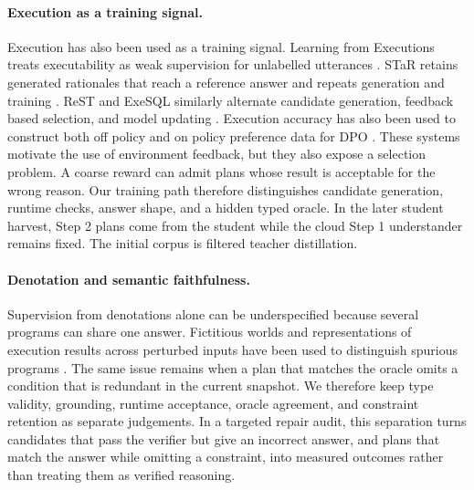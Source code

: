 \paragraph{Execution as a training signal.}
Execution has also been used as a training signal.  Learning from Executions treats executability
as weak supervision for unlabelled utterances \citep{wang2021executions}.  STaR retains generated
rationales that reach a reference answer and repeats generation and training
\citep{zelikman2022star}.  ReST and ExeSQL similarly alternate candidate
generation, feedback based selection, and model updating
\citep{gulcehre2023rest,zhang2025exesql}.  Execution accuracy has also been used to construct both
off policy and on policy preference data for DPO \citep{zhai2025excot}.  These systems motivate the
use of environment feedback,
but they also expose a selection problem.  A coarse reward can admit plans whose result is
acceptable for the wrong reason.  Our training path therefore distinguishes candidate generation,
runtime checks, answer shape, and a hidden typed oracle.  In the later student harvest, Step 2 plans
come from the student while the cloud Step 1 understander remains fixed.  The initial corpus is
filtered teacher distillation.

\paragraph{Denotation and semantic faithfulness.}
Supervision from denotations alone can be underspecified because several programs can share one
answer.  Fictitious worlds and representations of execution results across perturbed inputs have
been used to distinguish spurious programs \citep{pasupat2016denotations,lee2023spurious}.  The same issue remains
when a plan that matches the oracle omits a condition that is redundant in the current snapshot.  We
therefore keep type validity, grounding, runtime acceptance, oracle agreement, and constraint
retention as separate judgements.  In a targeted repair audit, this separation turns candidates
that pass the verifier but give an incorrect answer, and plans that match the answer while omitting
a constraint, into measured outcomes rather than treating them as verified reasoning.

